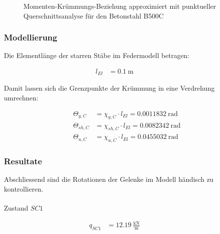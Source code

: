 \documentclass[
  11pt,
  letterpaper,
]{scrreprt}
\makeatletter
\let\oldparagraph\paragraph
\renewcommand{\paragraph}{
    \@ifstar
      \xxxParagraphStar
      \xxxParagraphNoStar
  }
\newcommand{\xxxParagraphStar}[1]{\oldparagraph*{#1}\mbox{}}
\newcommand{\xxxParagraphNoStar}[1]{\oldparagraph{#1}\mbox{}}
\makeatother
\begin{document}
\begin{figure}[H]


\caption{\label{fig-jag_m_chi_b500c}Momenten-Krümmungs-Beziehung
approximiert mit punktueller Querschnittsanalyse für den Betonstahl
B500C}

\end{figure}%

\subsubsection{Modellierung}\label{modellierung-1}

Die Elementlänge der starren Stäbe im Federmodell betragen:

\[
\begin{aligned}
l_{El}& = 0.1 \ \mathrm{m} \quad &  \quad &  
 \end{aligned}
\]

Damit lassen sich die Grenzpunkte der Krümmung in eine Verdrehung
umrechnen:

\[
\begin{aligned}
\Theta_{y , C}& = \chi_{y , C} \cdot l_{El} = 0.0011832 \ \mathrm{rad} \\ 
\Theta_{sh , C}& = \chi_{sh , C} \cdot l_{El} = 0.0082342 \ \mathrm{rad} \\ 
\Theta_{u , C}& = \chi_{u , C} \cdot l_{El} = 0.0455032 \ \mathrm{rad} \end{aligned}
\]

\subsubsection{Resultate}\label{resultate-1}

Abschliessend sind die Rotationen der Gelenke im Modell händisch zu
kontrollieren.

\paragraph{\texorpdfstring{Zustand
\(SC1\)}{Zustand SC1}}\label{zustand-sc1}

\[
\begin{aligned}
q_{SC1}& = 12.19 \ \frac{\mathrm{kN}}{\mathrm{m}} \quad &  \quad &  
 \end{aligned}
\]
\end{document}

